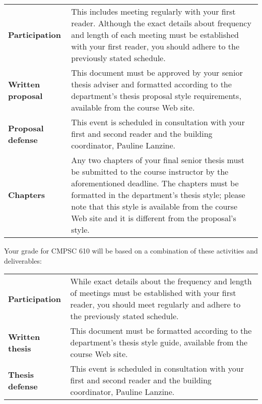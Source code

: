 %

\begin{center}
\begin{tabular}{lp{4in}}

\bf Participation & This includes meeting regularly with your first reader. Although the exact details about frequency and
length of each meeting must be established with your first reader, you should adhere to the previously stated schedule.
\\[.1in]

\bf Written proposal & This document must be approved by your senior thesis adviser and formatted according to the
department's thesis proposal style requirements, available from the course Web site. \\[.1in]

\bf Proposal defense & This event is scheduled in consultation with your first and second reader and the building
coordinator, Pauline Lanzine. \\[.1in]

\bf Chapters & Any two chapters of your final senior thesis must be submitted to the course instructor by the
aforementioned deadline.  The chapters must be formatted in the department's thesis style; please note that
this style is available from the course Web site and it is different from the proposal's style.

\end{tabular}
\end{center}


\vspace*{-.15in}
\noindent
Your grade for CMPSC 610 will be based on a combination of these activities and deliverables:
\begin{center}
\begin{tabular}{lp{4in}}
\bf Participation & While exact details about the frequency and length of meetings must be established with your first
reader, you should meet regularly and adhere to the previously stated schedule. \\[.1in]

\bf Written thesis & This document must be formatted according to the department's thesis style guide, available from
the course Web site. \\[.1in]

\bf Thesis defense & This event is scheduled in consultation with your first and second reader and the building
coordinator, Pauline Lanzine. \\[.1in]

%
\end{tabular}
\end{center}

